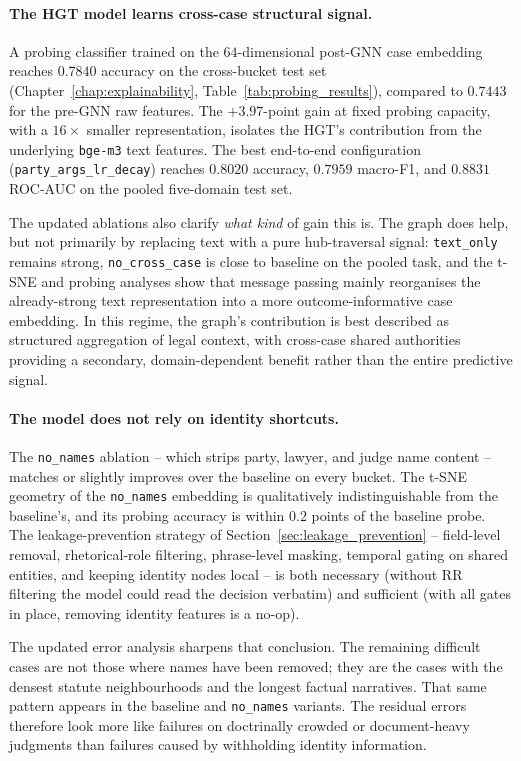\paragraph{The HGT model learns cross-case structural signal.} A
probing classifier trained on the $64$-dimensional post-GNN case
embedding reaches $0.7840$ accuracy on the cross-bucket test set
(Chapter~\ref{chap:explainability},
Table~\ref{tab:probing_results}), compared to $0.7443$ for the
pre-GNN raw features. The $+3.97$-point gain at fixed probing
capacity, with a $16\times$ smaller representation, isolates the
HGT's contribution from the underlying \texttt{bge-m3} text
features. The best end-to-end configuration
(\texttt{party\_args\_lr\_decay}) reaches $0.8020$ accuracy,
$0.7959$ macro-F1, and $0.8831$ ROC-AUC on the pooled five-domain
test set.

{The updated ablations also clarify \emph{what kind} of
gain this is. The graph does help, but not primarily by replacing text
with a pure hub-traversal signal: \texttt{text\_only} remains strong,
\texttt{no\_cross\_case} is close to baseline on the pooled task, and
the t-SNE and probing analyses show that message passing mainly
reorganises the already-strong text representation into a more
outcome-informative case embedding. In this regime, the graph's
contribution is best described as structured aggregation of legal
context, with cross-case shared authorities providing a secondary,
domain-dependent benefit rather than the entire predictive signal.\par}

\paragraph{The model does not rely on identity shortcuts.} The
\texttt{no\_names} ablation -- which strips party, lawyer, and judge
name content -- matches or slightly improves over the baseline on
every bucket. The t-SNE geometry of the \texttt{no\_names} embedding
is qualitatively indistinguishable from the baseline's, and its
probing accuracy is within $0.2$ points of the baseline probe. The
leakage-prevention strategy of
Section~\ref{sec:leakage_prevention} -- field-level removal,
rhetorical-role filtering, phrase-level masking, temporal gating on
shared entities, and keeping identity nodes local -- is both
necessary (without RR filtering the model could read the decision
verbatim) and sufficient (with all gates in place, removing identity
features is a no-op).

{The updated error analysis sharpens that conclusion. The
remaining difficult cases are not those where names have been removed;
they are the cases with the densest statute neighbourhoods and the
longest factual narratives. That same pattern appears in the baseline
and \texttt{no\_names} variants. The residual errors therefore look
more like failures on doctrinally crowded or document-heavy judgments
than failures caused by withholding identity information.\par}

